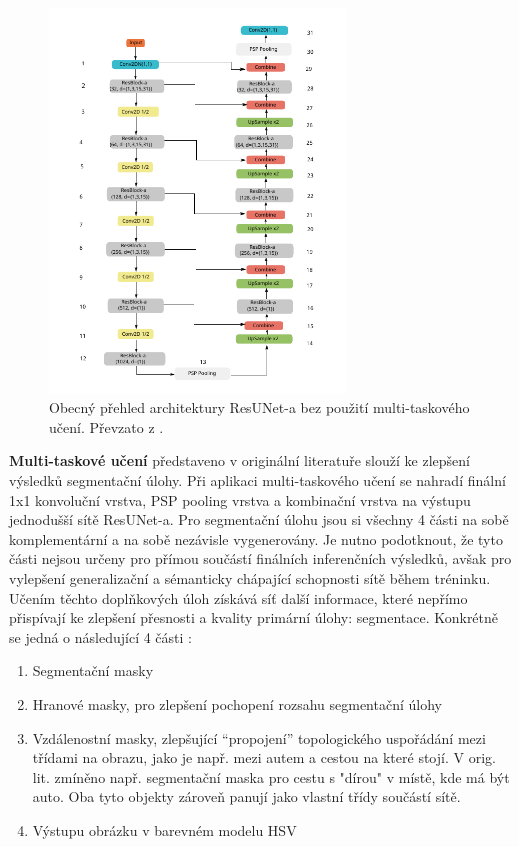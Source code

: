 \begin{figure}[H]
\centering
\includegraphics[width=0.7\textwidth,keepaspectratio]{Figures/resuneta_overview.pdf}
\caption[Obecný přehled architektury ResUNet-a]{Obecný přehled architektury ResUNet-a bez použití multi-taskového učení. Převzato z \cite{resuneta}. }
\label{fig:resuneta_overview}
\end{figure}

\textbf{Multi-taskové učení} představeno v originální literatuře slouží ke zlepšení výsledků segmentační úlohy. Při aplikaci multi-taskového učení se nahradí finální 1x1 konvoluční vrstva, PSP pooling vrstva a kombinační vrstva na výstupu jednodušší sítě ResUNet-a. Pro segmentační úlohu jsou si všechny 4 části na sobě komplementární a na sobě nezávisle vygenerovány. Je nutno podotknout, že tyto části nejsou určeny pro přímou součástí finálních inferenčních výsledků, avšak pro vylepšení generalizační a sémanticky chápající schopnosti sítě během tréninku. Učením těchto doplňkových úloh získává síť další informace, které nepřímo přispívají ke zlepšení přesnosti a kvality primární úlohy: segmentace. Konkrétně se jedná o následující 4 části \cite{resuneta}: 
\begin{enumerate}
    \item Segmentační masky
    \item Hranové masky, pro zlepšení pochopení rozsahu segmentační úlohy
    \item Vzdálenostní masky, zlepšující \enquote{propojení} topologického uspořádání mezi třídami na obrazu, jako je např. mezi autem a cestou na které stojí. V orig. lit. zmíněno např. segmentační maska pro cestu s "dírou" v místě, kde má být auto. Oba tyto objekty zároveň panují jako vlastní třídy součástí sítě.
    \item Výstupu obrázku v barevném modelu HSV
\end{enumerate}
\endinput